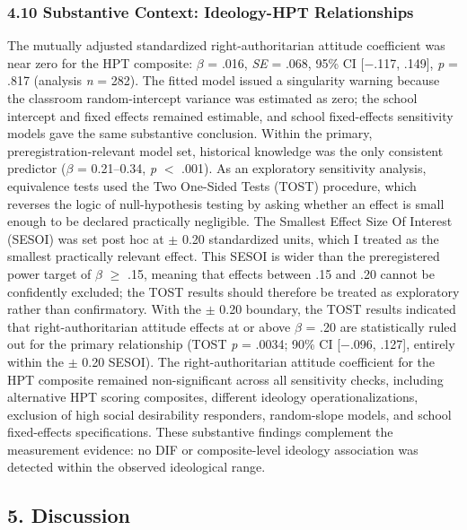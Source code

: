 \documentclass[
  12pt,
]{article}
\begin{document}
\hypertarget{substantive-context-ideology-hpt-relationships}{%
\subsubsection{4.10 Substantive Context: Ideology-HPT Relationships}\label{substantive-context-ideology-hpt-relationships}}

The mutually adjusted standardized right-authoritarian attitude coefficient
was near zero for the HPT composite: \(\beta\) = .016, \emph{SE} = .068, 95\%
CI [$-$.117, .149], \emph{p} = .817 (analysis \emph{n} = 282).
The fitted model issued a singularity warning because the classroom
random-intercept variance was estimated as zero; the school intercept and
fixed effects remained estimable, and school fixed-effects sensitivity models
gave the same substantive conclusion.
Within the primary, preregistration-relevant model set, historical knowledge
was the only consistent predictor (\(\beta\) = 0.21--0.34, \emph{p} $<$ .001).
As an exploratory sensitivity analysis, equivalence tests used the Two
One-Sided Tests (TOST) procedure, which reverses the logic of
null-hypothesis testing by asking whether an effect is small enough to
be declared practically negligible. The Smallest Effect Size Of
Interest (SESOI) was set post hoc at \(\pm\) 0.20 standardized units,
which I treated as the smallest practically relevant effect.
This SESOI is wider than the preregistered power target of \(\beta\)
\(\geq\) .15, meaning that effects between .15 and .20 cannot be
confidently excluded; the TOST results should therefore be treated as
exploratory rather than confirmatory. With the \(\pm\) 0.20 boundary,
the TOST results indicated that right-authoritarian attitude effects at
or above \(\beta\) = .20 are statistically ruled out for the primary
relationship (TOST \emph{p} = .0034; 90\% CI [$-$.096, .127], entirely
within the \(\pm\) 0.20 SESOI). The right-authoritarian attitude
coefficient for the HPT composite remained non-significant
across all sensitivity checks, including alternative HPT scoring
composites, different ideology operationalizations, exclusion of
high social desirability responders, random-slope models, and
school fixed-effects specifications. These substantive findings complement the measurement
evidence: no DIF or composite-level ideology
association was detected within the observed ideological range.

\hypertarget{discussion}{%
\subsection{5. Discussion}\label{discussion}}
\end{document}
